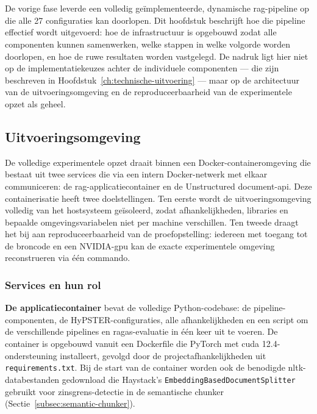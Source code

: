 \chapter{}%
\label{ch:pipeline-testen}

De vorige fase leverde een volledig geïmplementeerde, dynamische \gls{rag}-pipeline op die alle 27 configuraties kan doorlopen. Dit hoofdstuk beschrijft hoe die pipeline effectief wordt uitgevoerd: hoe de infrastructuur is opgebouwd zodat alle componenten kunnen samenwerken, welke stappen in welke volgorde worden doorlopen, en hoe de ruwe resultaten worden vastgelegd. De nadruk ligt hier niet op de implementatiekeuzes achter de individuele componenten — die zijn beschreven in Hoofdstuk~\ref{ch:technische-uitvoering} — maar op de architectuur van de uitvoeringsomgeving en de reproduceerbaarheid van de experimentele opzet als geheel.

\section{Uitvoeringsomgeving}
\label{sec:uitvoeringsomgeving}

De volledige experimentele opzet draait binnen een Docker-containeromgeving die bestaat uit twee services die via een intern Docker-netwerk met elkaar communiceren: de \gls{rag}-applicatiecontainer en de Unstructured document-\gls{api}. Deze containerisatie heeft twee doelstellingen. Ten eerste wordt de uitvoeringsomgeving volledig van het hostsysteem geïsoleerd, zodat afhankelijkheden, libraries en bepaalde omgevingsvariabelen niet per machine verschillen. Ten tweede draagt het bij aan reproduceerbaarheid van de proefopstelling: iedereen met toegang tot de broncode en een NVIDIA-\gls{gpu} kan de exacte experimentele omgeving reconstrueren via één commando.

\subsection{Services en hun rol}

\textbf{De applicatiecontainer} bevat de volledige Python-codebase: de pipeline-componenten, de HyPSTER-configuraties, alle afhankelijkheden en een script om de verschillende pipelines en \gls{ragas}-evaluatie in één keer uit te voeren. De container is opgebouwd vanuit een Dockerfile die PyTorch met \gls{cuda} 12.4-ondersteuning installeert, gevolgd door de projectafhankelijkheden uit \texttt{requirements.txt}. Bij de start van de container worden ook de benodigde \gls{nltk}-databestanden gedownload die Haystack's \texttt{EmbeddingBasedDocumentSplitter} gebruikt voor zinsgrens-detectie in de semantische chunker (Sectie~\ref{subsec:semantic-chunker}).

